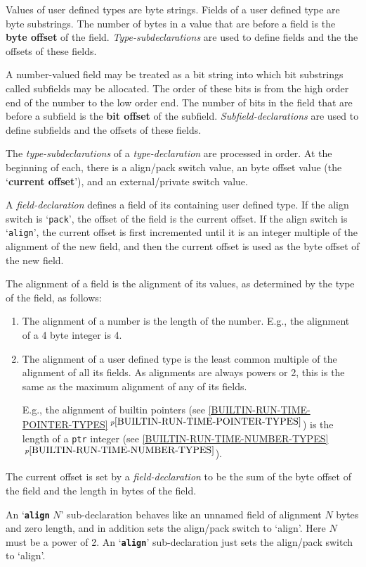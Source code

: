 \documentclass[12pt]{article}
\newcommand{\key}[1]{{\rm \bfseries #1}}
\newcommand{\ttkey}[1]{{\tt \bfseries #1}}
\newcommand{\itemref}[1]{\ref{#1}$\,^{p\pageref{#1}}$}
\begin{document}
Values of user defined types are byte strings.  Fields of a user defined
type are byte substrings.  The number of bytes in a value that are before
a field is the \key{byte offset} of the field.  {\em Type-subdeclarations}
are used to define fields and the the offsets of these fields.

A number-valued field may be treated as a bit string into which
bit substrings called subfields may be allocated.  The order of these
bits is from the high order end of the number to the low order end.
The number of bits
in the field that are before a subfield is the \key{bit offset} of the
subfield.  {\em Subfield-declarations} are used to define
subfields and the offsets of these fields.

The {\em type-subdeclarations} of a {\em type-declaration}
are processed in order.  At the
beginning of each, there is a align/pack switch value, an
byte offset value (the `\key{current offset}'), and an external/private
switch value.

A {\em field-declaration} defines a field of its containing user
defined type.  If the align switch is `{\tt pack}', the offset
of the field is the current offset.  If the align switch
is `{\tt align}', the current offset is first incremented
until it is an integer multiple of the alignment of the new field,
and then the current offset is used as the byte offset of the
new field.

The alignment of a field is the alignment of its values, as determined
by the type of the field, as follows:
\begin{enumerate}
\item The alignment of a number is the length of the number.  E.g., the
alignment of a 4 byte integer is 4.
\item The alignment of a user defined type is the least common multiple
of the alignment of all its fields.  As alignments are always powers
or 2, this is the same as the maximum alignment of any of its fields.

E.g., the alignment of builtin pointers
(see \itemref{BUILTIN-RUN-TIME-POINTER-TYPES}) is the length of a {\tt ptr}
integer (see \itemref{BUILTIN-RUN-TIME-NUMBER-TYPES}).
\end{enumerate}

The current offset is set by a {\em field-declaration} to be the
sum of the byte offset of the field and the length in bytes of the field.

An `\ttkey{align} $N$' sub-declaration behaves like an unnamed
field of alignment $N$ bytes and zero length,
and in addition sets the align/pack switch to `align'.
Here $N$ must be a power of 2.
An `\ttkey{align}' sub-declaration just sets the
align/pack switch to `align'.
\end{document}
